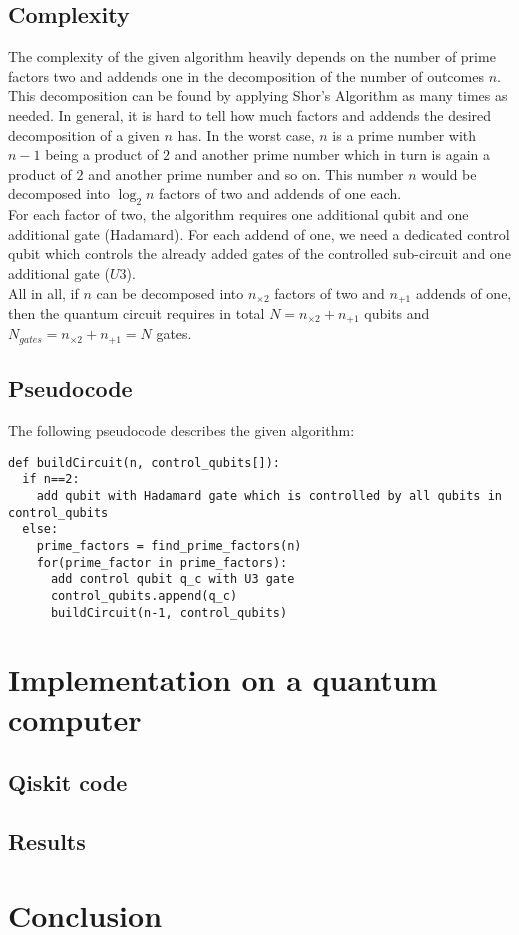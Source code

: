 \documentclass[12pt]{amsart}
\begin{document}
\subsection{Complexity}
The complexity of the given algorithm heavily depends on the number of prime factors two and addends one in the decomposition of the number of outcomes $n$. This decomposition can be found by applying Shor's Algorithm as many times as needed. In general, it is hard to tell how much factors and addends the desired decomposition of a given $n$ has. In the worst case, $n$ is a prime number with $n-1$ being a product of $2$ and another prime number which in turn is again a product of $2$ and another prime number and so on. This number $n$ would be decomposed into $\log_{2}n$ factors of two and addends of one each.\\
For each factor of two, the algorithm requires one additional qubit and one additional gate (Hadamard). For each addend of one, we need a dedicated control qubit which controls the already added gates of the controlled sub-circuit and one additional gate ($U3$).\\
All in all, if $n$ can be decomposed into $n_{\times2}$ factors of two and $n_{+1}$ addends of one, then the quantum circuit requires in total $N = n_{\times2} + n_{+1}$ qubits and $N_{gates} = n_{\times2} + n_{+1} = N$ gates.

\subsection{Pseudocode}
The following pseudocode describes the given algorithm:
\begin{lstlisting}[frame=single] 
def buildCircuit(n, control_qubits[]):
  if n==2:
    add qubit with Hadamard gate which is controlled by all qubits in control_qubits
  else:
    prime_factors = find_prime_factors(n)
    for(prime_factor in prime_factors):
      add control qubit q_c with U3 gate
      control_qubits.append(q_c)
      buildCircuit(n-1, control_qubits)
\end{lstlisting}

\section{Implementation on a quantum computer}

\subsection{Qiskit code}

\subsection{Results}

\section{Conclusion}
\end{document}
